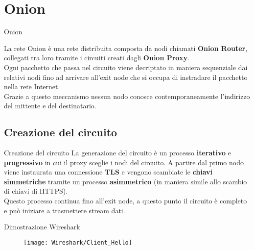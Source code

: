 \section{Onion}
\begin{frame}{Onion}
    \begin{figure}[htpb!]
        \centering
        
    \end{figure}
    La rete Onion è una rete distribuita composta da nodi chiamati \textbf{Onion Router}, collegati tra loro tramite i circuiti creati dagli \textbf{Onion Proxy}. \\
    Ogni pacchetto che passa nel circuito viene decriptato in maniera sequenziale dai relativi nodi fino ad arrivare all'exit node che si occupa di instradare il pacchetto nella rete Internet. \\ 
    Grazie a questo meccanismo nessun nodo conosce contemporaneamente l'indirizzo del mittente e del destinatario.
\end{frame}

\subsection{Creazione del circuito}
\begin{frame}{Creazione del circuito}
    La generazione del circuito è un processo \textbf{iterativo} e \textbf{progressivo} in cui il proxy sceglie i nodi del circuito. 
    A partire dal primo nodo viene instaurata una connessione \textbf{TLS} e vengono scambiate le \textbf{chiavi simmetriche} tramite un processo \textbf{asimmetrico} (in maniera simile allo scambio di chiavi di HTTPS). \\
    Questo processo continua fino all'exit node, a questo punto il circuito è completo e può iniziare a trasmettere stream dati.
\end{frame}
    
\begin{frame}
    \begin{figure}[htpb!]
        \centering
        
    \end{figure}
\end{frame}

\begin{frame}{Dimostrazione Wireshark}
    \begin{figure}
        \texttt{[image: Wireshark/Client\_Hello]}
    \end{figure}
\end{frame}

